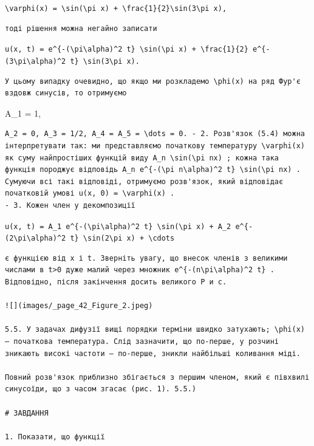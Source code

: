 \documentclass[
  ukrainian,
]{article}
\begin{document}
\texttt{\textbackslash{}varphi(x)\ =\ \textbackslash{}sin(\textbackslash{}pi\ x)\ +\ \textbackslash{}frac\{1\}\{2\}\textbackslash{}sin(3\textbackslash{}pi\ x),}

\begin{verbatim}
тоді рішення можна негайно записати
\end{verbatim}

\texttt{u(x,\ t)\ =\ e\^{}\{-(\textbackslash{}pi\textbackslash{}alpha)\^{}2\ t\}\ \textbackslash{}sin(\textbackslash{}pi\ x)\ +\ \textbackslash{}frac\{1\}\{2\}\ e\^{}\{-(3\textbackslash{}pi\textbackslash{}alpha)\^{}2\ t\}\ \textbackslash{}sin(3\textbackslash{}pi\ x).}

\begin{verbatim}
У цьому випадку очевидно, що якщо ми розкладемо \phi(x) на ряд Фур'є вздовж синусів, то отримуємо
\end{verbatim}

A\_1 = 1,

\begin{verbatim}
A_2 = 0, A_3 = 1/2, A_4 = A_5 = \dots = 0. - 2. Розв'язок (5.4) можна інтерпретувати так: ми представляємо початкову температуру \varphi(x) як суму найпростіших функцій виду A_n \sin(\pi nx) ; кожна така функція породжує відповідь A_n e^{-(\pi n\alpha)^2 t} \sin(\pi nx) . Сумуючи всі такі відповіді, отримуємо розв'язок, який відповідає початковій умові u(x, 0) = \varphi(x) .
- 3. Кожен член у декомпозиції
\end{verbatim}

\texttt{u(x,\ t)\ =\ A\_1\ e\^{}\{-(\textbackslash{}pi\textbackslash{}alpha)\^{}2\ t\}\ \textbackslash{}sin(\textbackslash{}pi\ x)\ +\ A\_2\ e\^{}\{-(2\textbackslash{}pi\textbackslash{}alpha)\^{}2\ t\}\ \textbackslash{}sin(2\textbackslash{}pi\ x)\ +\ \textbackslash{}cdots}

\begin{verbatim}
є функцією від x і t. Зверніть увагу, що внесок членів з великими числами в t>0 дуже малий через множник e^{-(n\pi\alpha)^2 t} . Відповідно, після закінчення досить великого Р и с.

![](images/_page_42_Figure_2.jpeg)

5.5. У задачах дифузії вищі порядки терміни швидко затухають; \phi(x) — початкова температура. Слід зазначити, що по-перше, у розчині зникають високі частоти — по-перше, зникли найбільші коливання міді.

Повний розв'язок приблизно збігається з першим членом, який є півхвилі синусоїди, що з часом згасає (рис. 1). 5.5.)

# ЗАВДАННЯ

1. Показати, що функції
\end{verbatim}
\end{document}
